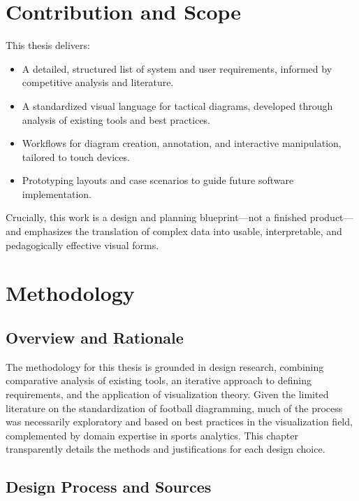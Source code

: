 \documentclass[11pt,a4paper,openright]{report}
\begin{document}
\chapter{Contribution and Scope}
This thesis delivers:
\begin{itemize}
    \item A detailed, structured list of system and user requirements, informed by competitive analysis and literature.
    \item A standardized visual language for tactical diagrams, developed through analysis of existing tools and best practices.
    \item Workflows for diagram creation, annotation, and interactive manipulation, tailored to touch devices.
    \item Prototyping layouts and case scenarios to guide future software implementation.
\end{itemize}
Crucially, this work is a design and planning blueprint—not a finished product—and emphasizes the translation of complex data into usable, interpretable, and pedagogically effective visual forms.


\chapter{Methodology}
\section{Overview and Rationale}

The methodology for this thesis is grounded in design research, combining comparative analysis of existing tools, an iterative approach to defining requirements, and the application of visualization theory. Given the limited literature on the standardization of football diagramming, much of the process was necessarily exploratory and based on best practices in the visualization field, complemented by domain expertise in sports analytics. This chapter transparently details the methods and justifications for each design choice.


\section{Design Process and Sources}
\end{document}
